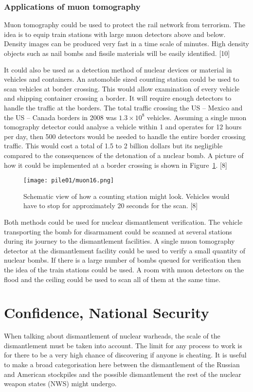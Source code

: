 \documentclass[twoside,titlepage,11pt,twocolumn,a4paper]{article}
\begin{document}
\subsubsection{Applications of muon tomography}
Muon tomography could be used to protect the rail network from
terrorism. The idea is to equip train stations with large muon
detectors above and below. Density images can be produced very fast in
a time scale of minutes. High density objects such as nail bombs and
fissile materials will be easily identified. [10]

It could also be used as a detection method of nuclear devices or
material in vehicles and containers.  An automobile sized counting
station could be used to scan vehicles at border crossing. This would
allow examination of every vehicle and shipping container crossing a
border. It will require enough detectors to handle the traffic at the
borders. The total traffic crossing the US -- Mexico and the US --
Canada borders in 2008 was \(1.3\times10^8\) vehicles. Assuming a
single muon tomography detector could analyse a vehicle within
\unit{1}{\minute} and operates for 12 hours per day, then 500
detectors would be needed to handle the entire border crossing
traffic. This would cost a total of 1.5 to 2 billion dollars but its
negligible compared to the consequences of the detonation of a nuclear
bomb. A picture of how it could be implemented at a border crossing is
shown in Figure~\ref{fig:muon16}. [8]

\begin{figure}
  \texttt{[image: pile01/muon16.png]}
  \caption{Schematic view of how a counting station might
    look. Vehicles would have to stop for approximately 20 seconds for
    the scan. [8]}
  \label{fig:muon16}
\end{figure}

Both methods could be used for nuclear dismantlement verification. The
vehicle transporting the bomb for disarmament could be scanned at
several stations during its journey to the dismantlement facilities. A
single muon tomography detector at the dismantlement facility could be
used to verify a small quantity of nuclear bombs. If there is a large
number of bombs queued for verification then the idea of the train
stations could be used. A room with muon detectors on the flood and
the ceiling could be used to scan all of them at the same time.

\section{Confidence, National Security}
When talking about dismantlement of nuclear warheads, the scale of the
dismantlement must be taken into account. The limit for any process to
work is for there to be a very high chance of discovering if anyone is
cheating. It is useful to make a broad categorisation here between the
dismantlement of the Russian and American stockpiles and the possible
dismantlement the rest of the nuclear weapon states (NWS) might
undergo.
\end{document}
